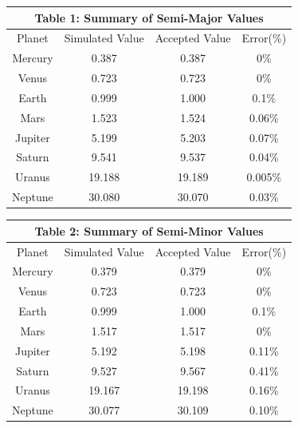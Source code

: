 \documentclass[a4paper,12pt]{article} %
\numberwithin{equation}{section} %
\numberwithin{figure}{section} %
\begin{document}
\begin{table}[h]
\centering
\begin{tabular}{|c|c|c|c|}
\hline
\multicolumn{4}{|c|}{\textbf{Table 1:} Summary of Semi-Major Values}\\
\hline
Planet & Simulated Value & Accepted Value & Error(\%)\\
\hline
Mercury & 0.387 & 0.387 & 0\%\\
\hline
Venus & 0.723 & 0.723 & 0\%\\
\hline
Earth & 0.999 & 1.000 & 0.1\%\\
\hline
Mars & 1.523 & 1.524 & 0.06\%\\
\hline
Jupiter & 5.199 & 5.203 & 0.07\%\\
\hline
Saturn & 9.541 & 9.537 & 0.04\%\\
\hline
Uranus & 19.188 & 19.189 & 0.005\%\\
\hline
Neptune & 30.080 & 30.070 & 0.03\%\\
\hline
\end{tabular}
\end{table}

\begin{table}[h]
\centering
\begin{tabular}{|c|c|c|c|}
\hline
\multicolumn{4}{|c|}{\textbf{Table 2:} Summary of Semi-Minor Values}\\
\hline
Planet & Simulated Value & Accepted Value & Error(\%)\\
\hline
Mercury & 0.379 & 0.379 & 0\%\\
\hline
Venus & 0.723 & 0.723 & 0\%\\
\hline
Earth & 0.999 & 1.000 & 0.1\%\\
\hline
Mars & 1.517 & 1.517 & 0\%\\
\hline
Jupiter & 5.192 & 5.198 & 0.11\%\\
\hline
Saturn & 9.527 & 9.567 & 0.41\%\\
\hline
Uranus & 19.167 & 19.198 & 0.16\%\\
\hline
Neptune & 30.077 & 30.109 & 0.10\%\\
\hline
\end{tabular}
\end{table}
\end{document}
